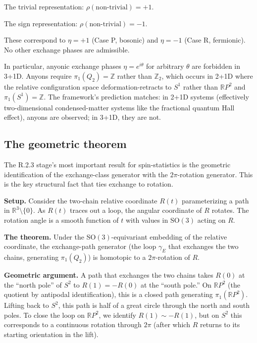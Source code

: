 \documentclass[11pt,a4paper]{article}
\begin{document}
The trivial representation: $\rho(\text{non-trivial}) = +1$.

The sign representation: $\rho(\text{non-trivial}) = -1$.

These correspond to $\eta = +1$ (Case P, bosonic) and $\eta = -1$ (Case R, fermionic). No other exchange phases are admissible.

In particular, anyonic exchange phases $\eta = e^{i\theta}$ for arbitrary $\theta$ are forbidden in 3+1D. Anyons require $\pi_1(Q_2) = \mathbb{Z}$ rather than $\mathbb{Z}_2$, which occurs in 2+1D where the relative configuration space deformation-retracts to $S^{1}$ rather than $\mathbb{R}P^{2}$ and $\pi_1(S^{1}) = \mathbb{Z}$. The framework's prediction matches: in 2+1D systems (effectively two-dimensional condensed-matter systems like the fractional quantum Hall effect), anyons are observed; in 3+1D, they are not.

\subsection{The geometric theorem}

The R.2.3 stage's most important result for spin-statistics is the geometric identification of the exchange-class generator with the $2\pi$-rotation generator. This is the key structural fact that ties exchange to rotation.

\textbf{Setup.} Consider the two-chain relative coordinate $R(t)$ parameterizing a path in $\mathbb{R}^{3} \setminus \{0\}$. As $R(t)$ traces out a loop, the angular coordinate of $R$ rotates. The rotation angle is a smooth function of $t$ with values in $\mathrm{SO}(3)$ acting on $R$.

\textbf{The theorem.} Under the $\mathrm{SO}(3)$-equivariant embedding of the relative coordinate, the exchange-path generator (the loop $\gamma_E$ that exchanges the two chains, generating $\pi_1(Q_2)$) is homotopic to a $2\pi$-rotation of $R$.

\textbf{Geometric argument.} A path that exchanges the two chains takes $R(0)$ at the ``north pole'' of $S^{2}$ to $R(1) = -R(0)$ at the ``south pole.'' On $\mathbb{R}P^{2}$ (the quotient by antipodal identification), this is a closed path generating $\pi_1(\mathbb{R}P^{2})$. Lifting back to $S^{2}$, this path is half of a great circle through the north and south poles. To close the loop on $\mathbb{R}P^{2}$, we identify $R(1) \sim -R(1)$, but on $S^{2}$ this corresponds to a continuous rotation through $2\pi$ (after which $R$ returns to its starting orientation in the lift).
\end{document}
